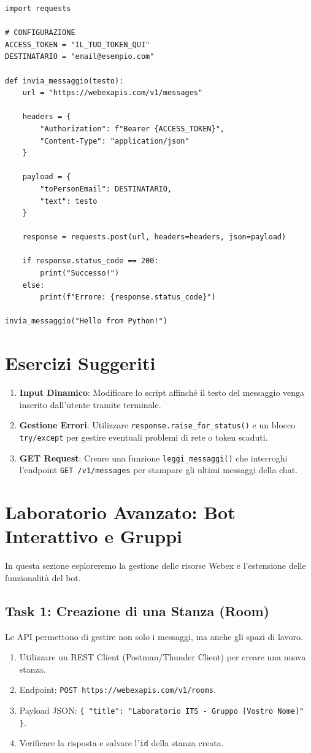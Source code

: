 \documentclass[11pt,a4paper]{article}
\begin{document}
\begin{lstlisting}
import requests

# CONFIGURAZIONE
ACCESS_TOKEN = "IL_TUO_TOKEN_QUI"
DESTINATARIO = "email@esempio.com" 

def invia_messaggio(testo):
    url = "https://webexapis.com/v1/messages"
    
    headers = {
        "Authorization": f"Bearer {ACCESS_TOKEN}",
        "Content-Type": "application/json"
    }
    
    payload = {
        "toPersonEmail": DESTINATARIO,
        "text": testo
    }
    
    response = requests.post(url, headers=headers, json=payload)
    
    if response.status_code == 200:
        print("Successo!")
    else:
        print(f"Errore: {response.status_code}")

invia_messaggio("Hello from Python!")
\end{lstlisting}

\section{Esercizi Suggeriti}
\begin{enumerate}
    \item \textbf{Input Dinamico}: Modificare lo script affinché il testo del messaggio venga inserito dall'utente tramite terminale.
    \item \textbf{Gestione Errori}: Utilizzare \texttt{response.raise\_for\_status()} e un blocco \texttt{try/except} per gestire eventuali problemi di rete o token scaduti.
    \item \textbf{GET Request}: Creare una funzione \texttt{leggi\_messaggi()} che interroghi l'endpoint \texttt{GET /v1/messages} per stampare gli ultimi messaggi della chat.
\end{enumerate}

\section{Laboratorio Avanzato: Bot Interattivo e Gruppi}

In questa sezione esploreremo la gestione delle risorse Webex e l'estensione delle funzionalità del bot.

\subsection{Task 1: Creazione di una Stanza (Room)}
Le API permettono di gestire non solo i messaggi, ma anche gli spazi di lavoro.
\begin{enumerate}
    \item Utilizzare un REST Client (Postman/Thunder Client) per creare una nuova stanza.
    \item Endpoint: \texttt{POST https://webexapis.com/v1/rooms}.
    \item Payload JSON: \texttt{\{ "title": "Laboratorio ITS - Gruppo [Vostro Nome]" \}}.
    \item Verificare la risposta e salvare l'\texttt{id} della stanza creata.
\end{enumerate}
\end{document}
